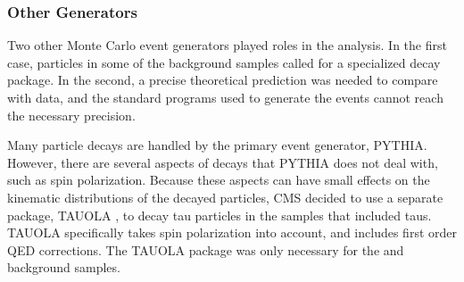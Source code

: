 

\subsubsection{Other Generators}
\label{sim:MCGensOther}



Two other Monte Carlo event generators 
played roles in the analysis.  
In the first case, 
particles in some of the background samples 
called for a specialized decay package.  
In the second, 
a precise theoretical prediction was needed 
to compare with data, 
and the standard programs used to generate 
the events 
cannot reach the necessary precision.  






Many particle decays are handled by 
the primary event generator, PYTHIA.  
However, there are several aspects of decays 
that PYTHIA does not deal with, 
such as spin polarization.  
Because these aspects can have small effects 
on the kinematic distributions of the decayed 
particles, 
CMS decided to use a separate package, TAUOLA 
\cite{TAUOLA}, 
to decay tau particles in the samples 
that included taus.  
TAUOLA specifically takes spin polarization 
into account, 
and includes first order QED corrections.  %
The TAUOLA package was only necessary for the 
\Ztautau and \Wtaunu background samples.  

